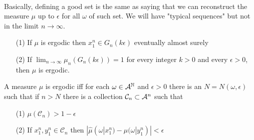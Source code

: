 \\Basically, defining a good set is the same as saying that we can reconstruct the measure $\mu$ up to $\epsilon$ for all $\omega$ of such set. We will have "typical sequences" but not in the limit $n \rightarrow \infty$.
\begin{theorem}
\hfill
    \begin{itemize}
        \item[(1)] If $\mu$ is ergodic then $x_1^n \in G_n(k \epsilon)$ eventually almost surely 
        \item[(2)] If $\lim_{n \rightarrow \infty} \mu_n ( G_n(k \epsilon) ) = 1 $ for every integer $k>0$ and every $\epsilon>0$, then $\mu$ is ergodic. 
    \end{itemize}
\end{theorem}
\begin{theorem}
    A measure $\mu$ is ergodic iff for each $\omega \in \mathcal{A}^{\mathbb{N}}$ and $\epsilon>0$ there is an $N = N(\omega, \epsilon)$ such that if $n>N$ there is a collection $\mathcal{C}_n \subset \mathcal{A}^n$ such that 
    \begin{itemize}
        \item[(1)] $\mu(\mathcal{C}_n) > 1 -\epsilon$
        \item[(2)] If $x_1^n, y_1^n \in \mathcal{C}_n$ then $|\hat{\mu}(\omega|x_1^n) - \hat{\mu}(\omega|y_1^n) | < \epsilon$
    \end{itemize}
\end{theorem}


